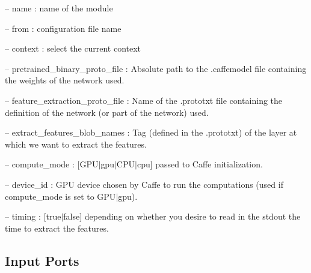 \begin{DoxyItemize}
\item -- name \+: name of the module
\item -- from \+: configuration file name
\item -- context \+: select the current context
\item -- pretrained\+\_\+binary\+\_\+proto\+\_\+file \+: Absolute path to the .caffemodel file containing the weights of the network used.
\item -- feature\+\_\+extraction\+\_\+proto\+\_\+file \+: Name of the .prototxt file containing the definition of the network (or part of the network) used.
\item -- extract\+\_\+features\+\_\+blob\+\_\+names \+: Tag (defined in the .prototxt) of the layer at which we want to extract the features.
\item -- compute\+\_\+mode \+: \mbox{[}G\+P\+U$\vert$gpu$\vert$\+C\+P\+U$\vert$cpu\mbox{]} passed to Caffe initialization.
\item -- device\+\_\+id \+: G\+PU device chosen by Caffe to run the computations (used if compute\+\_\+mode is set to G\+P\+U$\vert$gpu).
\item -- timing \+: \mbox{[}true$\vert$false\mbox{]} depending on whether you desire to read in the stdout the time to extract the features. 
\end{DoxyItemize}\hypertarget{group__caffeCoder_inputports_sec}{}\subsection{Input Ports}\label{group__caffeCoder_inputports_sec}

